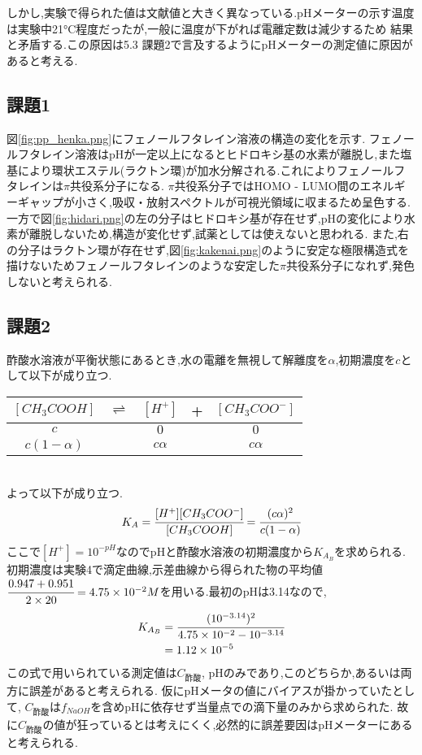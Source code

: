 しかし,実験で得られた値は文献値\cite{rikougaku}と大きく異なっている.pHメーターの示す温度は実験中21\si{\degreeCelsius}程度だったが,一般に温度が下がれば電離定数は減少するため
結果と矛盾する.この原因は5.3 課題2で言及するようにpHメーターの測定値に原因があると考える.
\subsection{課題1}
図\ref{fig:pp_henka.png}にフェノールフタレイン溶液の構造の変化を示す.
フェノールフタレイン溶液はpHが一定以上になるとヒドロキシ基の水素が離脱し,また塩基により環状エステル(ラクトン環)が加水分解される.これによりフェノールフタレインは$\pi$共役系分子になる. $\pi$共役系分子ではHOMO - LUMO間のエネルギーギャップが小さく,吸収・放射スペクトルが可視光領域に収まるため呈色する.\cite{Muranaka}
一方で図\ref{fig:hidari.png}の左の分子はヒドロキシ基が存在せず,pHの変化により水素が離脱しないため,構造が変化せず,試薬としては使えないと思われる.
また,右の分子はラクトン環が存在せず,図\ref{fig:kakenai.png}のように安定な極限構造式を描けないためフェノールフタレインのような安定した$\pi$共役系分子になれず,発色しないと考えられる.
\subsection{課題2}
酢酸水溶液が平衡状態にあるとき,水の電離を無視して解離度を$\alpha$,初期濃度を$c$として以下が成り立つ.
\begin{table}[h]
   \centering
   \begin{tabular}{ccccc}
     \hline
     $[CH_3COOH]$&$\rightleftharpoons$&$[H^+]$&+&$[CH_3COO^-]$\\
     \hline
     $c$&&$0$&&$0$\\
     $c(1-\alpha)$&&$c\alpha$&&$c\alpha$\\
     \hline
   \end{tabular}
\end{table}\\
よって以下が成り立つ.
\begin{equation}
  \label{equ:KAB}
  K_A=\cfrac{[H^+][CH_3COO^-]}{[CH_3COOH]}=\cfrac{(c\alpha)^2}{c(1-\alpha)}
\end{equation}
ここで$[H^+]=10^{-pH}$なのでpHと酢酸水溶液の初期濃度から$K_{A_B}$を求められる.
初期濃度は実験4で滴定曲線,示差曲線から得られた物の平均値$\cfrac{0.947+0.951}{2\times20}=4.75\times10^{-2}M$を用いる.最初のpHは3.14なので,
\begin{align*}
  K_{A_B}&=\cfrac{(10^{-3.14})^2}{4.75\times10^{-2}-10^{-3.14}}\\
  &=1.12\times10^{-5}
\end{align*}
この式で用いられている測定値は$C_{酢酸}$, pHのみであり,このどちらか,あるいは両方に誤差があると考えられる.
仮にpHメータの値にバイアスが掛かっていたとして, $C_{酢酸}$は$f_{NaOH}$を含めpHに依存せず当量点での滴下量のみから求められた.
故に$C_{酢酸}$の値が狂っているとは考えにくく,必然的に誤差要因はpHメーターにあると考えられる.